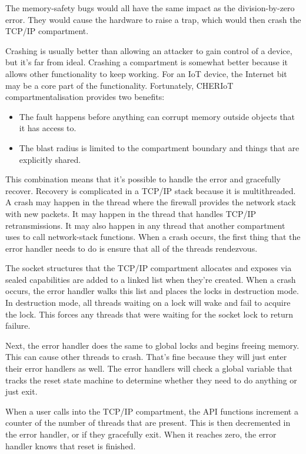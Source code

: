 The memory-safety bugs would all have the same impact as the division-by-zero error.
They would cause the hardware to raise a trap, which would then crash the TCP/IP compartment.

Crashing is usually better than allowing an attacker to gain control of a device, but it's far from ideal.
Crashing a compartment is somewhat better because it allows other functionality to keep working.
For an IoT device, the Internet bit may be a core part of the functionality.
Fortunately, CHERIoT compartmentalisation provides two benefits:

\begin{itemize}
	\item{The fault happens before anything can corrupt memory outside objects that it has access to.}
	\item{The blast radius is limited to the compartment boundary and things that are explicitly shared.}
\end{itemize}

This combination means that it's possible to handle the error and gracefully recover.
Recovery is complicated in a TCP/IP stack because it is multithreaded.
A crash may happen in the thread where the firewall provides the network stack with new packets.
It may happen in the thread that handles TCP/IP retransmissions.
It may also happen in any thread that another compartment uses to call network-stack functions.
When a crash occurs, the first thing that the error handler needs to do is ensure that all of the threads rendezvous.

The socket structures that the TCP/IP compartment allocates and exposes via sealed capabilities are added to a linked list when they're created.
When a crash occurs, the error handler walks this list and places the locks in destruction mode.
In destruction mode, all threads waiting on a lock will wake and fail to acquire the lock.
This forces any threads that were waiting for the socket lock to return failure.

Next, the error handler does the same to global locks and begins freeing memory.
This can cause other threads to crash.
That's fine because they will just enter their error handlers as well.
The error handlers will check a global variable that tracks the reset state machine to determine whether they need to do anything or just exit.

When a user calls into the TCP/IP compartment, the API functions increment a counter of the number of threads that are present.
This is then decremented in the error handler, or if they gracefully exit.
When it reaches zero, the error handler knows that reset is finished.

